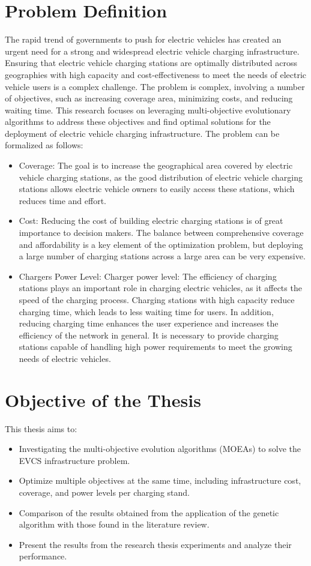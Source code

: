 \documentclass[12pt]{report}
\begin{document}
\section{Problem Definition}
The rapid trend of governments to push for electric vehicles has created an urgent need for a strong and widespread electric vehicle charging infrastructure. Ensuring that electric vehicle charging stations are optimally distributed across geographies with high capacity and cost-effectiveness to meet the needs of electric vehicle users is a complex challenge. The problem is complex, involving a number of objectives, such as increasing coverage area, minimizing costs, and reducing waiting time. This research focuses on leveraging multi-objective evolutionary algorithms to address these objectives and find optimal solutions for the deployment of electric vehicle charging infrastructure. The problem can be formalized as follows:
\begin{itemize}
    \item Coverage: The goal is to increase the geographical area covered by electric vehicle charging stations, as the good distribution of electric vehicle charging stations allows electric vehicle owners to easily access these stations, which reduces time and effort.
    \item Cost: Reducing the cost of building electric charging stations is of great importance to decision makers. The balance between comprehensive coverage and affordability is a key element of the optimization problem, but deploying a large number of charging stations across a large area can be very expensive.
    \item Chargers Power Level: Charger power level: The efficiency of charging stations plays an important role in charging electric vehicles, as it affects the speed of the charging process. Charging stations with high capacity reduce charging time, which leads to less waiting time for users. In addition, reducing charging time enhances the user experience and increases the efficiency of the network in general. It is necessary to provide charging stations capable of handling high power requirements to meet the growing needs of electric vehicles.
\end{itemize}

\section{Objective of the Thesis}
This thesis aims to:
\begin{itemize}
    \item Investigating the multi-objective evolution algorithms (MOEAs) to solve the EVCS infrastructure problem.
    \item Optimize multiple objectives at the same time, including infrastructure cost, coverage, and power levels per charging stand.
    \item Comparison of the results obtained from the application of the genetic algorithm with those found in the literature review.
    \item Present the results from the research thesis experiments and analyze their performance.
\end{itemize}
\end{document}
